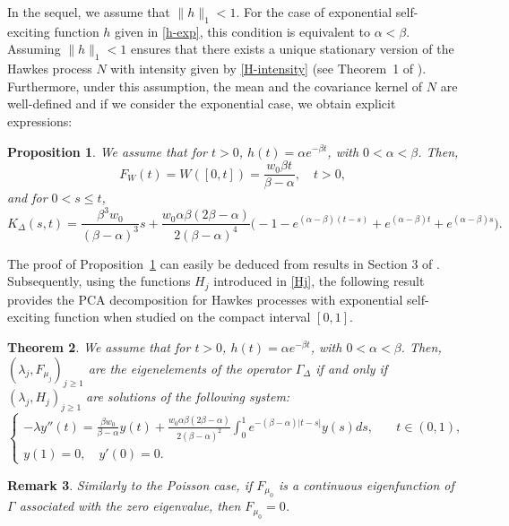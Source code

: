 \documentclass[aos]{imsart}
\theoremstyle{plain}
\newtheorem{theorem}{Theorem}[section]
\newtheorem{proposition}[theorem]{Proposition}%
\newtheorem{remark}[theorem]{Remark}
\theoremstyle{remark}
\newcommand{\1}{1}
\begin{document}
In the sequel, we assume that $\|h\|_1<1$. For the case of exponential self-exciting function $h$ given in \eqref{h-exp}, this condition is equivalent to $\alpha<\beta$.  
Assuming  $\|h\|_1<1$ ensures that  there exists a unique stationary version of the Hawkes process  $N$ with intensity given by \eqref{H-intensity} (see Theorem~1 of \cite{BM1}). Furthermore, under this assumption, the mean and the covariance kernel of $N$ are well-defined and if we consider the exponential case, we obtain explicit expressions:
\begin{proposition}\label{cor:Hawkes_exp}
We assume that for $t> 0$, $h(t)=\alpha e^{-\beta t}$, with $0<\alpha<\beta$. Then,
\begin{equation}\label{mean-Hawkes}
 F_W(t)=W([0,t])=\frac{w_0\beta t}{\beta-\alpha}, \quad t>0,
\end{equation}
and for $0<s\leq t$,
\begin{equation}\label{eq:K_Hawkes_exp}
K_\Delta(s,t)=\frac{\beta^3w_0}{(\beta-\alpha)^3}s+\frac{w_0\alpha\beta(2\beta-\alpha)}{2(\beta-\alpha)^4}\big(-1-e^{(\alpha-\beta)(t-s)}+e^{(\alpha-\beta)t}+e^{(\alpha-\beta)s}\big).
\end{equation}
\end{proposition}
The proof of Proposition~\ref{cor:Hawkes_exp} can easily be deduced from results in Section 3 of \cite{GaoZhu2018}.
Subsequently, using the functions $H_j$ introduced in \eqref{Hj}, the following result provides the PCA decomposition for Hawkes processes with exponential self-exciting function when studied on the compact interval $[0,1]$.
\begin{theorem}\label{Hawkes-ed}
We assume that for $t> 0$, $h(t)=\alpha e^{-\beta t}$, with $0<\alpha<\beta$. Then, $(\lambda_j,F_{\mu_j})_{j\geq 1}$ are the eigenelements of the operator $\Gamma_\Delta$ if and only if $(\lambda_j,H_j)_{j\geq 1}$ are solutions of the following system:
\begin{equation}\label{SL-Hawkes}
\left\{
\begin{array}{ll}
\displaystyle -\lambda y''(t)=\frac{\beta w_0}{\beta-\alpha}y(t)+\frac{w_0\alpha\beta(2\beta-\alpha)}{2(\beta-\alpha)^2}\int_0^1e^{-(\beta-\alpha)|t-s|}y(s)ds,   &\quad t\in(0,1),\\
y(1)  =0,\quad y'(0)=0.&
\end{array}
\right.
\end{equation}
\end{theorem}
\begin{remark}\label{eigenvalue=0Hawkes}
Similarly to the Poisson case, if $F_{\mu_0}$ is a continuous eigenfunction of $\Gamma$ associated with the zero eigenvalue, then $F_{\mu_0}=0$.
\end{remark}
\end{document}
